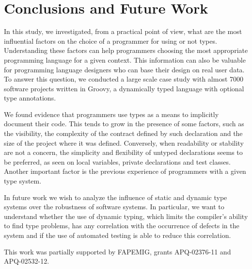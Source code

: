 \documentclass[preprint]{sigplanconf}
\begin{document}
\section{Conclusions and Future Work\label{conclusion}}
In this study, we investigated, from a practical point of view, what are the most influential factors on the choice of a programmer for using or not types.
Understanding these factors can help programmers choosing the most appropriate programming language for a given context.
This information can also be valuable for programming language designers who can base their design on real user data.
To answer this question, we conducted a large scale case study with almost 7000 software projects written in Groovy, a dynamically typed language with optional type annotations. 

We found evidence that programmers use types as a means to implicitly document their code.
This tends to grow in the presence of some factors, such as the visibility, the complexity of the contract defined by such declaration and the size of the project where it was defined. 
Conversely, when readability or stability are not a concern, the simplicity and flexibility of untyped declarations seems to be preferred, as seen on local variables, private declarations and test classes.
Another important factor is the previous experience of programmers with a given type system.

In future work we wish to analyze the influence of static and dynamic type systems over the robustness of software systems.
In particular, we want to understand whether the use of dynamic typing, which limits the compiler's ability to find type problems, has any correlation with the occurrence of defects in the system and if the use of automated testing is able to reduce this correlation.


\acks
This work was partially supported by FAPEMIG, grants APQ-02376-11 and APQ-02532-12.
\end{document}
